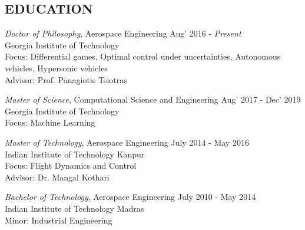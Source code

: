 \documentclass[margin, 10pt]{res} %
\begin{document}
\begin{resume}

 



\section{EDUCATION}

{\sl Doctor of Philosophy}, Aerospace Engineering \hfill Aug' 2016 - \emph{Present} \\
Georgia Institute of Technology \\
Focus: Differential games, Optimal control under uncertainties, Autonomous vehicles, Hypersonic vehicles\\
Advisor: Prof. Panagiotis Tsiotras

{\sl Master of Science}, Computational Science and Engineering \hfill Aug' 2017 - Dec' 2019\\
Georgia Institute of Technology \\
Focus: Machine Learning

{\sl Master of Technology}, Aerospace Engineering \hfill July 2014 - May 2016 \\
Indian Institute of Technology Kanpur \\
Focus: Flight Dynamics and Control\\
Advisor: Dr. Mangal Kothari

{\sl Bachelor of Technology}, Aerospace Engineering  \hfill July 2010 - May 2014 \\
Indian Institute of Technology Madras \\
Minor: Industrial Engineering
 
 

\end{resume}
\end{document}
